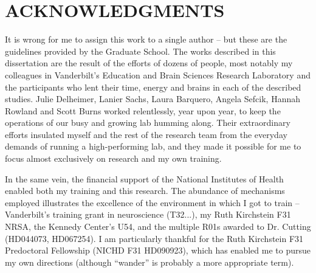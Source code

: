 \documentclass[12pt]{report}  %
\begin{document}
\doublespacing
{} \setcounter{page}{1}



\chapter*{ACKNOWLEDGMENTS}
\vspace{7mm}


It is wrong for me to assign this work to a single author -- but these are the guidelines provided by the Graduate School. The works described in this dissertation are the result of the efforts of dozens of people, most notably my colleagues in Vanderbilt's Education and Brain Sciences Research Laboratory and the participants who lent their time, energy and brains in each of the described studies. Julie Delheimer, Lanier Sachs, Laura Barquero, Angela Sefcik, Hannah Rowland and Scott Burns worked relentlessly, year upon year, to keep the operations of our busy and growing lab humming along. Their extraordinary efforts insulated myself and the rest of the research team from the everyday demands of running a high-performing lab, and they made it possible for me to focus almost exclusively on research and my own training. 

In the same vein, the financial support of the National Institutes of Health enabled both my training and this research. The abundance of mechanisms employed illustrates the excellence of the environment in which I got to train -- Vanderbilt's training grant in neuroscience (T32...), my Ruth Kirchstein F31 NRSA, the Kennedy Center's U54, and the multiple R01s awarded to Dr. Cutting (HD044073, HD067254). I am particularly thankful for the Ruth Kirchstein F31 Predoctoral Fellowship (NICHD F31 HD090923), which has enabled me to pursue my own directions (although ``wander'' is probably a more appropriate term).
\end{document}
